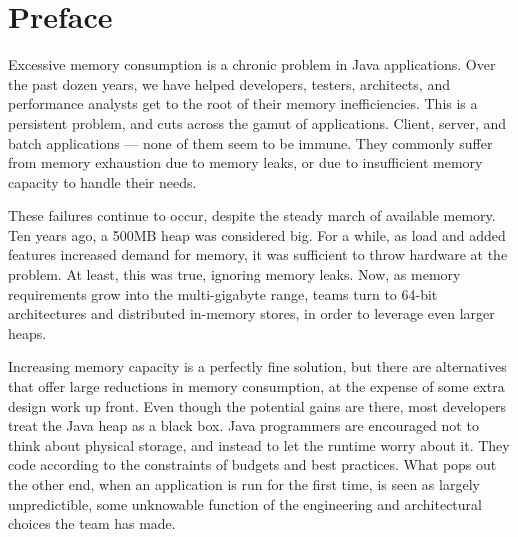 \chapter*{Preface}
\label{chapter:preface}

Excessive memory consumption is a chronic problem in Java applications.
Over the past dozen years, we have helped developers, testers, architects, and
performance analysts get to the root of their memory inefficiencies.
This is a persistent problem, and cuts across the gamut of applications.
Client, server, and batch applications --- none of them seem to be immune. They
commonly suffer from memory exhaustion due to memory leaks, or due to
insufficient memory capacity to handle their needs.

These failures continue to occur, despite the steady march of available memory.
Ten years ago, a 500MB heap was considered big. For a while, as load and added
features increased demand for memory, it was sufficient to throw hardware at the
problem. At least, this was true, ignoring memory leaks.
Now, as memory requirements grow into the multi-gigabyte range, teams turn to
64-bit architectures and distributed in-memory stores, in order to leverage even
larger heaps.






Increasing memory capacity is a perfectly fine solution, but there are
alternatives that offer large reductions in memory consumption, at the expense
of some extra design work up front. Even though the potential gains are there,
most developers treat the Java heap as a black box.
Java programmers are encouraged not to think about physical storage, and instead
to let the runtime worry about it. They code according to the constraints of
budgets and best practices. What pops out the other end, when an application is
run for the first time, is seen as largely unpredictible, some unknowable
function of the engineering and architectural choices the team has made.

